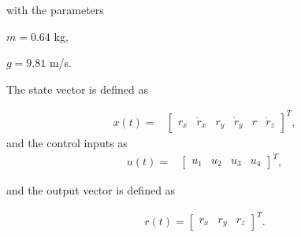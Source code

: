 with the parameters  

$m=0.64 $ kg, 

$g=9.81$ m/s.


The state vector is defined as

\begin{align*}
x(t)=&
\begin{bmatrix}
r_x & \dot{r}_x & r_y & \dot{r}_y & r &\dot{r}_z 
\end{bmatrix}^T,
\end{align*}
and the control inputs as
\begin{align*}
u(t)=&
\begin{bmatrix}
u_1 & u_2 &u_3 & u_4
\end{bmatrix}^T,
\end{align*}

and the output vector is defined as

\begin{align*}
r(t)=
\begin{bmatrix}
r_{x} & r_{y} & r_{z}
\end{bmatrix}^T.
\end{align*}
